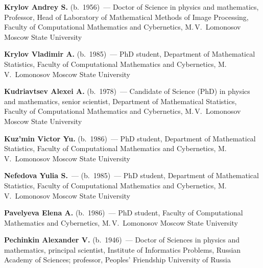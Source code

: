 \begin{multicols}{2}
\vspace*{3pt}

\noindent
\textbf{Krylov Andrey S.} (b.\ 1956)~--- Doctor of Science in physics 
and mathematics, Professor, Head of Laboratory of Mathematical Methods
of Image Processing, Faculty of Computational Mathematics and Cybernetics, 
M.\,V.~Lomonosov Moscow State University

\vspace*{3pt}

\noindent
\textbf{Krylov Vladimir A.} (b.\ 1985)~--- PhD student, 
Department of Mathematical Statistics, 
Faculty of Computational Mathematics and Cybernetics, M.\,V.~Lomonosov Moscow State University

\columnbreak

\noindent
\textbf{Kudriavtsev Alexei A.} (b.\ 1978)~--- Candidate of Science (PhD) 
in physics and mathematics, senior scientist, Department of Mathematical 
Statistics, Faculty of Computational Mathematics and Cybernetics, 
M.\,V.~Lomonosov Moscow State University 

\vspace*{3pt}

\noindent
\textbf{Kuz'min Victor Yu.} (b.\ 1986)~--- PhD student, 
Department of Mathematical Statistics, 
Faculty of Computational Mathematics and Cybernetics, M.\,V.~Lomonosov Moscow State University

\vspace*{3pt}

\noindent
\textbf{Nefedova Yulia S.}~--- (b.\ 1985)~--- PhD student, 
Department of Mathematical Statistics, Faculty of Computational Mathematics 
and Cybernetics, M.\,V.~Lomonosov Moscow State University 

\vspace*{3pt}

\noindent
\textbf{Pavelyeva Elena A.} (b.\ 1986)~--- PhD student, 
Faculty of Computational Mathematics and Cybernetics, 
M.\,V.~Lomonosov Moscow State University

\vspace*{3pt}

\noindent
\textbf{Pechinkin Alexander V.} (b.\ 1946)~--- Doctor of Sciences in physics and mathematics,
principal scientist, Institute of Informatics Problems, Russian Academy of Sciences;
professor, Peoples' Friendship University of Russia

\vspace*{3pt}


\end{multicols}
